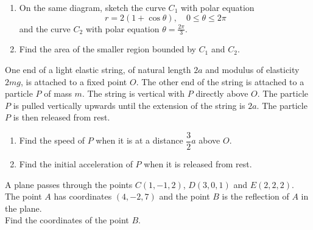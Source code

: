 \documentclass[leqno]{article}
\begin{document}
\djsFrontMatter
\begin{enumerate}[
  label=\textbf{\arabic*.},
  leftmargin=*,
  topsep=0pt,
  partopsep=0pt,
  parsep=0pt
]

\questionitem

\begin{enumerate}[label=\textbf{(\alph*)}]
  \item On the same diagram, sketch the curve $C_1$ with polar equation
  \[
  r=2(1+\cos\theta),\quad 0\leq\theta\leq2\pi
  \]
  and the curve $C_2$ with polar equation $\theta=\frac{2\pi}{3}$.  \\
  \item Find the area of the smaller region bounded by $C_1$ and $C_2$.  \\
\end{enumerate}

\newpage

\questionitem

One end of a light elastic string, of natural length $2a$ and modulus of elasticity $2mg$, is attached to a fixed point $O$. The other end of the string is attached to a particle $P$ of mass $m$. The string is vertical with $P$ directly above $O$. The particle $P$ is pulled vertically upwards until the extension of the string is $2a$. The particle $P$ is then released from rest. \\
\begin{enumerate}[label=\textbf{(\alph*)}]
  \item Find the speed of $P$ when it is at a distance $\dfrac{3}{2}a$ above $O$.  \\
  \item Find the initial acceleration of $P$ when it is released from rest.  \\
\end{enumerate}

\newpage

\questionitem

A plane passes through the points $C(1,-1,2)$, $D(3,0,1)$ and $E(2,2,2)$. \\

The point $A$ has coordinates $(4,-2,7)$ and the point $B$ is the reflection of $A$ in the plane. \\

Find the coordinates of the point $B$. 


\end{enumerate}
\end{document}
